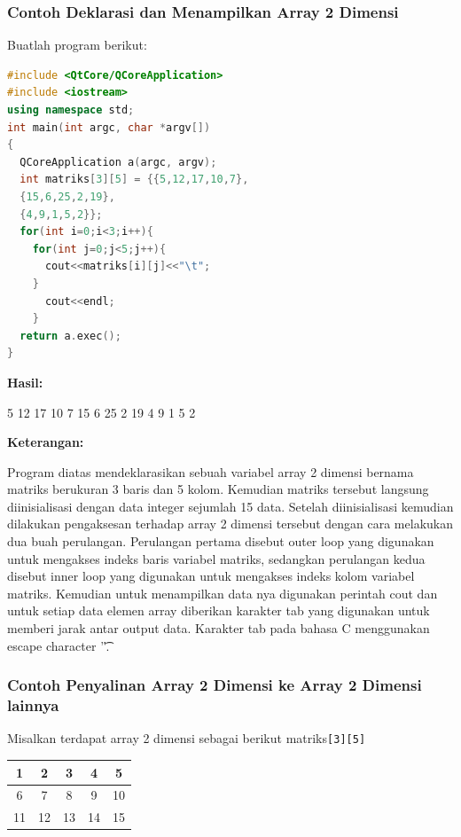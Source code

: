 \subsubsection*{Contoh  Deklarasi dan Menampilkan Array 2 Dimensi}

Buatlah program berikut:

\begin{lstlisting}[language=c++, caption=Deklarasi dan Menampilkan Array 2 Dimensi, label=contoh3-9]
#include <QtCore/QCoreApplication>
#include <iostream>
using namespace std;
int main(int argc, char *argv[])
{
  QCoreApplication a(argc, argv);
  int matriks[3][5] = {{5,12,17,10,7},
  {15,6,25,2,19},
  {4,9,1,5,2}};
  for(int i=0;i<3;i++){
    for(int j=0;j<5;j++){
      cout<<matriks[i][j]<<"\t";
    }
      cout<<endl;
    }
  return a.exec();
}
\end{lstlisting}

\textbf{Hasil:}

\begin{lcverbatim}
5	12	17	10	7
15	6	25	2	19
4	 9	1	 5	2
\end{lcverbatim}


\textbf{Keterangan:}

Program diatas mendeklarasikan sebuah variabel array 2 dimensi bernama
matriks berukuran 3 baris dan 5 kolom. Kemudian matriks tersebut
langsung diinisialisasi dengan data integer sejumlah 15 data. Setelah
diinisialisasi kemudian dilakukan pengaksesan terhadap array 2 dimensi
tersebut dengan cara melakukan dua buah perulangan. Perulangan pertama
disebut outer loop yang digunakan untuk mengakses indeks baris variabel
matriks, sedangkan perulangan kedua disebut inner loop yang digunakan
untuk mengakses indeks kolom variabel matriks. Kemudian untuk
menampilkan data nya digunakan perintah cout dan untuk setiap data
elemen array diberikan karakter tab yang digunakan untuk memberi jarak
antar output data. Karakter tab pada bahasa C menggunakan escape
character '\t'.

\subsubsection*{Contoh  Penyalinan Array 2 Dimensi ke Array 2 Dimensi lainnya}

Misalkan terdapat array 2 dimensi sebagai berikut
matriks\texttt{{[}3{]}{[}5{]}}

\begin{tabular}{|c|c|c|c|c|}
	\hline
	1 & 2 & 3 & 4 & 5 \\ \hline
	6 & 7 & 8 & 9 & 10 \\ \hline
	11 & 12 & 13 & 14 & 15 \\ \hline
	
\end{tabular}

